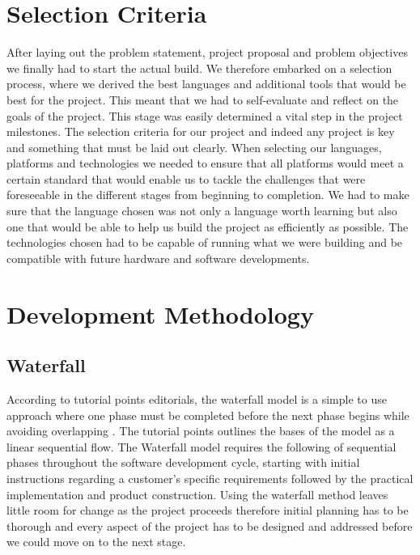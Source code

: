 \section{Selection Criteria}

After laying out the problem statement, project proposal and problem objectives we finally had to start the actual build. We therefore embarked on a selection process, where we derived the best languages and additional tools that would be best for the project. This meant that we had to self-evaluate and reflect on the goals of the project. This stage was easily determined a vital step in the project milestones.
The selection criteria for our project and indeed any project is key and something that must be laid out clearly. When selecting our languages, platforms and technologies we needed to ensure that all platforms would meet a certain standard that would enable us to tackle the challenges that were foreseeable in the different stages from beginning to completion.
\newline
\newline
We had to make sure that the language chosen was not only a language worth learning but also one that would be able to help us build the project as efficiently as possible. The technologies chosen had to be capable of running what we were building and be compatible with future hardware and software developments.


 
\section{Development Methodology}

\subsection{Waterfall}

According to tutorial points editorials, the waterfall model is a simple to use approach where one phase must be completed before the next phase begins while avoiding overlapping \cite{WFM}. The tutorial points outlines the bases of the model as a linear sequential flow. The Waterfall model requires the following of sequential phases throughout the software development cycle, starting with initial instructions regarding a customer’s specific requirements followed by the practical implementation and product construction. Using the waterfall method leaves little room for change as the project proceeds therefore initial planning has to be thorough and every aspect of the project has to be designed and addressed before we could move on to the next stage.


